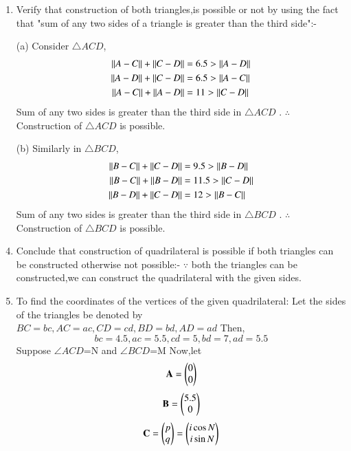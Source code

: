 \documentclass[journal,12pt,twocolumn]{IEEEtran}
\begin{document}
\begin{enumerate}
\item Verify that construction of both triangles,is possible or not by using the fact that "sum of any two sides of a triangle is greater than the third side":-
   \item[(a)]
Consider $\triangle ACD$,
\begin{align}
    \left\lVert A-C\right\rVert+\left\lVert C-D\right\rVert &=6.5 >\left\lVert A-D\right\rVert\\
    \left\lVert A-D\right\rVert+\left\lVert C-D\right\rVert &=6.5 >\left\lVert A-C\right\rVert\\
    \left\lVert A-C\right\rVert+\left\lVert A-D\right\rVert &=11 >\left\lVert C-D\right\rVert
\end{align}
Sum of any two sides is greater than the third side in $\triangle ACD$ .
 $\therefore$ Construction of $\triangle ACD$ is possible.
\item[(b)]
Similarly in $\triangle BCD$,
\begin{align}
    \left\lVert B-C\right\rVert+\left\lVert C-D\right\rVert &=9.5 >\left\lVert B-D\right\rVert\\
     \left\lVert B-C\right\rVert+\left\lVert B-D\right\rVert &=11.5 >\left\lVert C-D\right\rVert\\
    \left\lVert B-D\right\rVert+\left\lVert C-D\right\rVert &=12 >\left\lVert B-C\right\rVert
\end{align}
Sum of any two sides is greater than the third side in $\triangle BCD$ .
    $\therefore$ Construction of $\triangle BCD$ is possible.
\item Conclude that construction of quadrilateral is possible if both triangles can be constructed otherwise not possible:-
$\because$ both the triangles can be constructed,we can construct the quadrilateral with the given sides.
\item To find the coordinates of the vertices of the given quadrilateral:
Let the sides of the triangles be denoted by $BC=bc,AC=ac,CD=cd,BD=bd,AD=ad$ 
Then,
\begin{equation}
   bc=4.5,ac=5.5,cd=5,bd=7,ad=5.5 
\end{equation}
Suppose $\angle ACD$=N and  $\angle BCD$=M
Now,let
\begin{equation}
   \mathbf{A}=\begin{pmatrix}0\\0\end{pmatrix} \label{eq1}
\end{equation}
\begin{equation}
    \mathbf{B}=\begin{pmatrix}5.5\\0\end{pmatrix} \label{eq2}
\end{equation}
\begin{equation}
     \mathbf{C}=\begin{pmatrix}p\\q\end{pmatrix}=\begin{pmatrix}i\cos N\\i\sin N\end{pmatrix} \label{eq3}
\end{equation}
\begin{equation}

\end{equation}
\end{enumerate}
\end{document}
